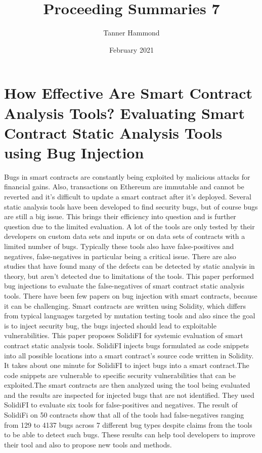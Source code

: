 \documentclass{article}
\title{Proceeding Summaries 7}
\author{Tanner Hammond}
\date{February 2021}
\begin{document}
\maketitle

\section{How Effective Are Smart Contract Analysis Tools? Evaluating Smart Contract Static Analysis Tools using Bug Injection \cite{Ghaleb}}

Bugs in smart contracts are constantly being exploited by malicious attacks for financial gains. Also, transactions on Ethereum are immutable and cannot be reverted and it's difficult to update a smart contract after it's deployed. Several static analysis tools have been developed to find security bugs, but of course bugs are still a big issue. This brings their efficiency into question and is further question due to the limited evaluation. A lot of the tools are only tested by their developers on custom data sets and inputs or on data sets of contracts with a limited number of bugs. Typically these tools also have false-positives and negatives, false-negatives in particular being a critical issue. There are also studies that have found many of the defects can be detected by static analysis in theory, but aren't detected due to limitations of the tools. This paper performed bug injections to evaluate the false-negatives of smart contract static analysis tools. There have been few papers on bug injection with smart contracts, because it can be challenging. Smart contracts are written using Solidity, which differs from typical languages targeted by mutation testing tools and also since the goal is to inject security bug, the bugs injected should lead to exploitable vulnerabilities. This paper proposes SolidiFI for systemic evaluation of smart contract static analysis tools. SolidiFI injects bugs formulated as code snippets into all possible locations into a smart contract's source code written in Solidity. It takes about one minute for SolidiFI to inject bugs into a smart contract.The code snippets are vulnerable to specific security vulnerabilities that can be exploited.The smart contracts are then analyzed using the tool being evaluated and the results are inspected for injected bugs that are not identified. They used SolidiFI to evaluate six tools for false-positives and negatives. The result of SolidiFi on 50 contracts show that all of the tools had false-negatives ranging from 129 to 4137 bugs across 7 different bug types despite claims from the tools to be able to detect such bugs. These results can help tool developers to improve their tool and also to propose new tools and methods. 
\end{document}
